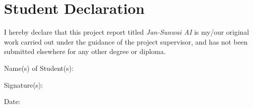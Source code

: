 \chapter*{Student Declaration}

I hereby declare that this project report titled \textit{Jan-Sunwai AI} is my/our original work carried out under the guidance of the project supervisor, and has not been submitted elsewhere for any other degree or diploma.

\vspace{2cm}
\noindent Name(s) of Student(s): \hrulefill

\vspace{1cm}
\noindent Signature(s): \hrulefill

\vspace{1cm}
\noindent Date: \hrulefill
